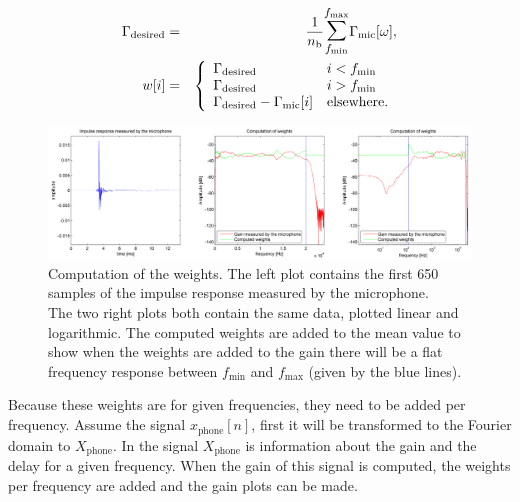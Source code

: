 \begin{eqnarray}
\label{eq:gain_desired}\Gamma_\text{desired}&=&\dfrac{1}{n_\text{b}}\mathlarger{\mathlarger{\sum}}\limits_{f_\text{min}}^{f_\text{max}}\Gamma_\text{mic}[\omega],
\\
\label{eq:gain_weight}w[i]&=&\left\{\begin{array}{ll}
\Gamma_\text{desired}&i<f_\text{min}\\
\Gamma_\text{desired}&i>f_\text{min}\\
\Gamma_\text{desired}-\Gamma_\text{mic}[i]&\text{elsewhere.}
\end{array}
\right.
\end{eqnarray}

\begin{figure}[t!]
    \centering
    \includegraphics[width=\textwidth]{afbeeldingen/plots/weights.png}
    \caption[Computation of the weights]{Computation of the weights. The left plot contains the first 650 samples of the impulse response measured by the microphone.\\
    The two right plots both contain the same data, plotted linear and logarithmic. The computed weights are added to the mean value to show when the weights are added to the gain there will be a flat frequency response between $f_\text{min}$ and $f_\text{max}$ (given by the blue lines).}
    \label{fig:weights}
\end{figure}

Because these weights are for given frequencies, they need to be added per frequency.
Assume the signal $x_\text{phone}[n]$, first it will be transformed to the Fourier domain to $X_\text{phone}$.
In the signal $X_\text{phone}$ is information about the gain and the delay for a given frequency.
When the gain of this signal is computed, the weights per frequency are added and the gain plots can be made.

